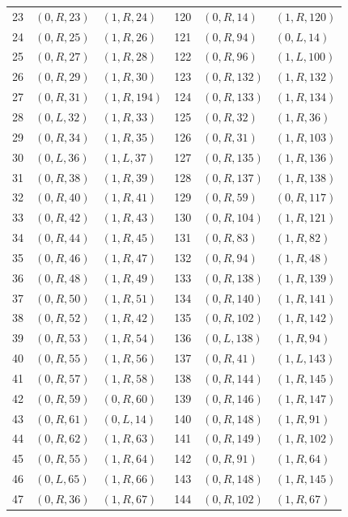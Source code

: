 \begin{longtable}{rll@{\qquad\qquad}rll}
23 & $(0,R,23)$ & $(1,R,24)$ & 120 & $(0,R,14)$ & $(1,R,120)$\\
24 & $(0,R,25)$ & $(1,R,26)$ & 121 & $(0,R,94)$ & $(0,L,14)$\\
25 & $(0,R,27)$ & $(1,R,28)$ & 122 & $(0,R,96)$ & $(1,L,100)$\\
26 & $(0,R,29)$ & $(1,R,30)$ & 123 & $(0,R,132)$ & $(1,R,132)$\\
27 & $(0,R,31)$ & $(1,R,194)$ & 124 & $(0,R,133)$ & $(1,R,134)$\\
28 & $(0,L,32)$ & $(1,R,33)$ & 125 & $(0,R,32)$ & $(1,R,36)$\\
29 & $(0,R,34)$ & $(1,R,35)$ & 126 & $(0,R,31)$ & $(1,R,103)$\\
30 & $(0,L,36)$ & $(1,L,37)$ & 127 & $(0,R,135)$ & $(1,R,136)$\\
31 & $(0,R,38)$ & $(1,R,39)$ & 128 & $(0,R,137)$ & $(1,R,138)$\\
32 & $(0,R,40)$ & $(1,R,41)$ & 129 & $(0,R,59)$ & $(0,R,117)$\\
33 & $(0,R,42)$ & $(1,R,43)$ & 130 & $(0,R,104)$ & $(1,R,121)$\\
34 & $(0,R,44)$ & $(1,R,45)$ & 131 & $(0,R,83)$ & $(1,R,82)$\\
35 & $(0,R,46)$ & $(1,R,47)$ & 132 & $(0,R,94)$ & $(1,R,48)$\\
36 & $(0,R,48)$ & $(1,R,49)$ & 133 & $(0,R,138)$ & $(1,R,139)$\\
37 & $(0,R,50)$ & $(1,R,51)$ & 134 & $(0,R,140)$ & $(1,R,141)$\\
38 & $(0,R,52)$ & $(1,R,42)$ & 135 & $(0,R,102)$ & $(1,R,142)$\\
39 & $(0,R,53)$ & $(1,R,54)$ & 136 & $(0,L,138)$ & $(1,R,94)$\\
40 & $(0,R,55)$ & $(1,R,56)$ & 137 & $(0,R,41)$ & $(1,L,143)$\\
41 & $(0,R,57)$ & $(1,R,58)$ & 138 & $(0,R,144)$ & $(1,R,145)$\\
42 & $(0,R,59)$ & $(0,R,60)$ & 139 & $(0,R,146)$ & $(1,R,147)$\\
43 & $(0,R,61)$ & $(0,L,14)$ & 140 & $(0,R,148)$ & $(1,R,91)$\\
44 & $(0,R,62)$ & $(1,R,63)$ & 141 & $(0,R,149)$ & $(1,R,102)$\\
45 & $(0,R,55)$ & $(1,R,64)$ & 142 & $(0,R,91)$ & $(1,R,64)$\\
46 & $(0,L,65)$ & $(1,R,66)$ & 143 & $(0,R,148)$ & $(1,R,145)$\\
47 & $(0,R,36)$ & $(1,R,67)$ & 144 & $(0,R,102)$ & $(1,R,67)$\\

\end{longtable}
